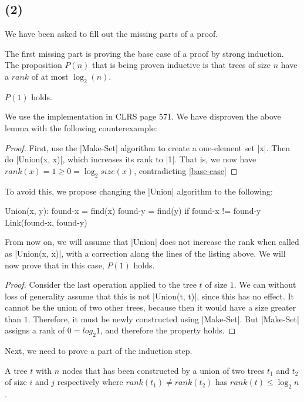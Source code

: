 \documentclass[a4paper]{article}
\begin{document}
\subsection*{(2)}

We have been asked to fill out the missing parts of a proof.

The first missing part is proving the base case of a proof by strong induction. The proposition \(P(n)\) that is being proven inductive is that trees of size \(n\) have a \(rank\) of at most \(\log_2(n)\).

\begin{lemma} \label{base-case} \(P(1)\) holds. \end{lemma}

We use the implementation in CLRS page 571. We have disproven the above lemma with the following counterexample:

\begin{proof} First, use the \code|Make-Set| algorithm to create a one-element set \code|x|. Then do \code|Union(x, x)|, which increases its rank to \code|1|. That is, we now have \(rank(x) = 1 \ge 0 = \log_2 size(x)\), contradicting \ref{base-case} \end{proof}

To avoid this, we propose changing the \code|Union| algorithm to the following:

\begin{Code}
Union(x, y):
    found-x = find(x)
    found-y = find(y)
    if found-x != found-y
        Link(found-x, found-y)
\end{Code}

From now on, we will assume that \code|Union| does not increase the rank when called as \code|Union(x, x)|, with a correction along the lines of the listing above. We will now prove that in this case, \(P(1)\) holds.

\begin{proof}
Consider the last operation applied to the tree \(t\) of size \(1\). We can without loss of generality assume that this is not \code|Union(t, t)|, since this has no effect. It cannot be the union of two other trees, because then it would have a size greater than \(1\). Therefore, it must be newly constructed using \code|Make-Set|. But \code|Make-Set| assigns a rank of \(0 = log_2 1\), and therefore the property holds.
\end{proof}

Next, we need to prove a part of the induction step. 

\begin{lemma} A tree \(t\) with \(n\) nodes that has been constructed by a union of two trees \(t_1\) and \(t_2\) of size \(i\) and \(j\) respectively where \(rank(t_1) \ne rank(t_2)\) has \(rank(t) \le \log_2 n\). \end{lemma}
\end{document}
